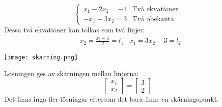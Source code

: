 \begin{Ex}
    \[
        \begin{cases}
        	x_1 - 2x_2 = -1 &\text{Två ekvationer}\\ 
        	-x_1 + 3x_2 = 3 &\text{Två obekanta}
        \end{cases}
    \]
    Dessa två ekvationer kan tolkas som två linjer:
    \begin{align*}
    &x_2 = \frac{x_1 + 1}{2} = l_1 & x_1 = 3x_2 -3 = l_2
    \end{align*}
    \begin{center}
    	\texttt{[image: skarning.png]}
    \end{center}
    Lösningen ges av skärningen mellan linjerna:
    \[
        \begin{bmatrix} x_1\\x_2 \end{bmatrix} = \begin{bmatrix} 3\\2 \end{bmatrix}
    \]
    Det finns inga fler lösningar eftersom det bara finns en skärningspunkt.
\end{Ex}
